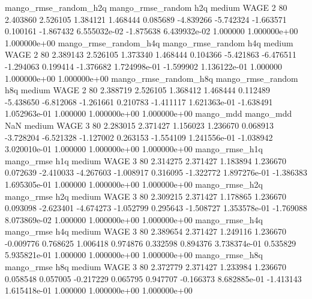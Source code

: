 mango_rmse_random_h2q mango_rmse_random                  h2q     medium     WAGE                 2 80  2.403860       2.526105 1.384121       1.468444    0.085689     -4.839266     -5.742324    -1.663571       0.100161 -1.867432 6.555032e-02    -1.875638   6.439932e-02            1.000000    1.000000e+00        1.000000e+00
mango_rmse_random_h4q mango_rmse_random                  h4q     medium     WAGE                 2 80  2.389143       2.526105 1.373340       1.468444    0.104366     -5.421863     -6.476511    -1.294063       0.199414 -1.376682 1.724998e-01    -1.599902   1.136122e-01            1.000000    1.000000e+00        1.000000e+00
mango_rmse_random_h8q mango_rmse_random                  h8q     medium     WAGE                 2 80  2.388719       2.526105 1.368412       1.468444    0.112489     -5.438650     -6.812068    -1.261661       0.210783 -1.411117 1.621363e-01    -1.638491   1.052963e-01            1.000000    1.000000e+00        1.000000e+00
            mango_mdd         mango_mdd                  NaN     medium     WAGE                 3 80  2.283015       2.371427 1.156023       1.236670    0.068913     -3.728204     -6.521328    -1.127002       0.263153 -1.554109 1.241556e-01    -1.038942   3.020010e-01            1.000000    1.000000e+00        1.000000e+00
       mango_rmse_h1q        mango_rmse                  h1q     medium     WAGE                 3 80  2.314275       2.371427 1.183894       1.236670    0.072639     -2.410033     -4.267603    -1.008917       0.316095 -1.322772 1.897276e-01    -1.386383   1.695305e-01            1.000000    1.000000e+00        1.000000e+00
       mango_rmse_h2q        mango_rmse                  h2q     medium     WAGE                 3 80  2.309215       2.371427 1.178865       1.236670    0.093098     -2.623401     -4.674273    -1.052799       0.295643 -1.508727 1.353578e-01    -1.769088   8.073869e-02            1.000000    1.000000e+00        1.000000e+00
       mango_rmse_h4q        mango_rmse                  h4q     medium     WAGE                 3 80  2.389654       2.371427 1.249116       1.236670   -0.009776      0.768625      1.006418     0.974876       0.332598  0.894376 3.738374e-01     0.535829   5.935821e-01            1.000000    1.000000e+00        1.000000e+00
       mango_rmse_h8q        mango_rmse                  h8q     medium     WAGE                 3 80  2.372779       2.371427 1.233984       1.236670    0.058548      0.057005     -0.217229     0.065795       0.947707 -0.166373 8.682885e-01    -1.413143   1.615418e-01            1.000000    1.000000e+00        1.000000e+00
